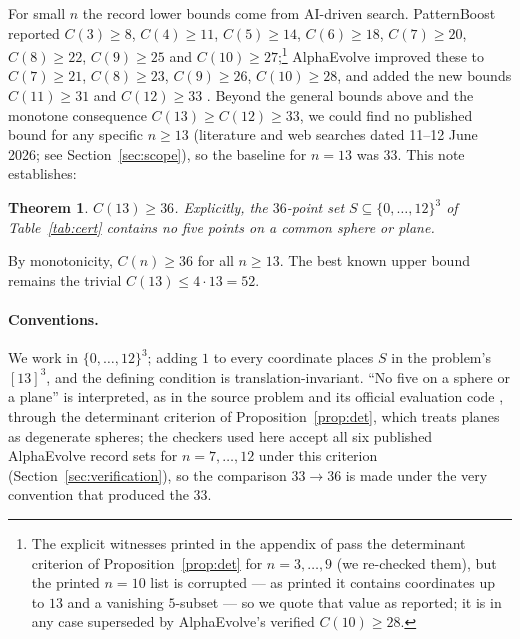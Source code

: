 \documentclass[10pt]{article}
\newtheorem{theorem}{Theorem}[section]
\theoremstyle{remark}
\begin{document}
For small $n$ the record lower bounds come from AI-driven search. PatternBoost
\cite{PatternBoost} reported $C(3) \ge 8$, $C(4) \ge 11$, $C(5) \ge 14$,
$C(6) \ge 18$, $C(7) \ge 20$, $C(8) \ge 22$, $C(9) \ge 25$ and
$C(10) \ge 27$;\footnote{The explicit witnesses printed in the appendix of
\cite{PatternBoost} pass the determinant criterion of
Proposition~\ref{prop:det} for $n = 3,\dots,9$ (we re-checked them), but the
printed $n = 10$ list is corrupted --- as printed it contains coordinates up
to $13$ and a vanishing $5$-subset --- so we quote that value as reported; it
is in any case superseded by AlphaEvolve's verified $C(10) \ge 28$.}
AlphaEvolve \cite{AlphaEvolve,AlphaEvolveMath} improved
these to $C(7) \ge 21$, $C(8) \ge 23$, $C(9) \ge 26$, $C(10) \ge 28$, and
added the new bounds $C(11) \ge 31$ and $C(12) \ge 33$
\cite[Problem~6.60]{AlphaEvolveMath}. Beyond the general bounds above and the
monotone consequence $C(13) \ge C(12) \ge 33$, we could find no published
bound for any specific $n \ge 13$ (literature and web searches dated 11--12
June 2026; see Section~\ref{sec:scope}), so the baseline for $n = 13$ was
$33$. This note establishes:

\begin{theorem}\label{thm:main}
$C(13) \ge 36$. Explicitly, the $36$-point set $S \subseteq \{0,\dots,12\}^3$
of Table~\ref{tab:cert} contains no five points on a common sphere or plane.
\end{theorem}

By monotonicity, $C(n) \ge 36$ for all $n \ge 13$. The best known upper
bound remains the trivial $C(13) \le 4 \cdot 13 = 52$.

\paragraph{Conventions.}
We work in $\{0,\dots,12\}^3$; adding $1$ to every coordinate places $S$ in
the problem's $[13]^3$, and the defining condition is translation-invariant.
``No five on a sphere or a plane'' is interpreted, as in the source problem
and its official evaluation code \cite{Repo}, through the determinant
criterion of Proposition~\ref{prop:det}, which treats planes as degenerate
spheres; the checkers used here accept all six published AlphaEvolve record
sets for $n = 7,\dots,12$ under this criterion
(Section~\ref{sec:verification}), so the comparison $33 \to 36$ is made
under the very convention that produced the $33$.
\end{document}
